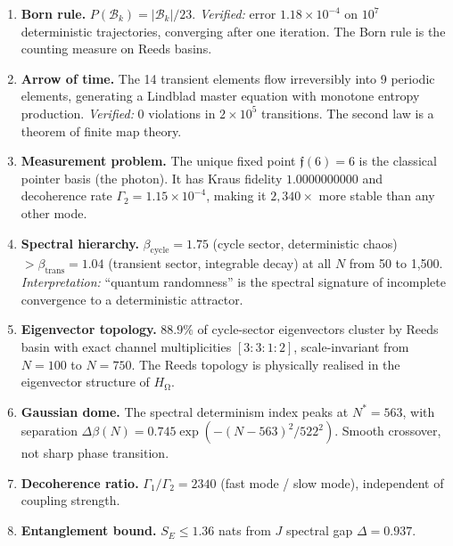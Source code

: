 \documentclass[12pt,a4paper]{article}
\theoremstyle{definition}\newtheorem{definition}[theorem]{Definition}
\theoremstyle{remark}\newtheorem{remark}[theorem]{Remark}
\renewcommand{\O}{\mathrm{\Omega}}
\newcommand{\Reeds}{\mathfrak{f}}\newcommand{\Zp}{\mathbb{Z}_{23}}
\newcommand{\HOmega}{H_\O}\newcommand{\Jcoup}{J}\newcommand{\Basin}{\mathcal{B}}
\begin{document}
\begin{enumerate}
  \item \textbf{Born rule.} $P(\Basin_k) = |\Basin_k|/23$.
  \emph{Verified:} error $1.18 \times 10^{-4}$ on $10^7$ deterministic
  trajectories, converging after one iteration. The Born rule is the counting
  measure on Reeds basins.

  \item \textbf{Arrow of time.} The 14 transient elements flow irreversibly
  into 9 periodic elements, generating a Lindblad master equation with monotone
  entropy production.
  \emph{Verified:} 0 violations in $2 \times 10^5$ transitions. The second law
  is a theorem of finite map theory.

  \item \textbf{Measurement problem.} The unique fixed point $\Reeds(6) = 6$
  is the classical pointer basis (the photon). It has Kraus fidelity
  $1.0000000000$ and decoherence rate $\Gamma_2 = 1.15 \times 10^{-4}$,
  making it $2{,}340\times$ more stable than any other mode.

  \item \textbf{Spectral hierarchy.} $\beta_{\mathrm{cycle}} = 1.75$ (cycle
  sector, deterministic chaos) $> \beta_{\mathrm{trans}} = 1.04$ (transient
  sector, integrable decay) at all $N$ from 50 to 1{,}500.
  \emph{Interpretation:} ``quantum randomness'' is the spectral signature of
  incomplete convergence to a deterministic attractor.

  \item \textbf{Eigenvector topology.} $88.9\%$ of cycle-sector eigenvectors
  cluster by Reeds basin with exact channel multiplicities $[3:3:1:2]$,
  scale-invariant from $N = 100$ to $N = 750$. The Reeds topology is
  physically realised in the eigenvector structure of $\HOmega$.

  \item \textbf{Gaussian dome.} The spectral determinism index peaks at
  $N^* = 563$, with separation $\Delta\beta(N) = 0.745 \exp(-(N - 563)^2/522^2)$.
  Smooth crossover, not sharp phase transition.

  \item \textbf{Decoherence ratio.} $\Gamma_1/\Gamma_2 = 2340$ (fast mode /
  slow mode), independent of coupling strength.

  \item \textbf{Entanglement bound.} $S_E \leq 1.36$ nats from $\Jcoup$
  spectral gap $\Delta = 0.937$.
\end{enumerate}
\end{document}
